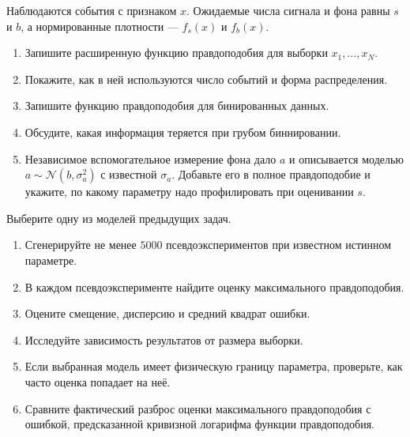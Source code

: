 \documentclass[
  russian,
  11pt,
  a4paper,
  open=any]{scrbook}
\providecommand{\tightlist}{%
  \setlength{\itemsep}{0pt}\setlength{\parskip}{0pt}}
\begin{document}
\begin{semanticpdfbox}[colback=BookCoralSoft,borderline west={1.2mm}{0pt}{BookCoral}]

\par\nopagebreak[4]\vspace{1.2mm}

Наблюдаются события с признаком \(x\). Ожидаемые числа сигнала и фона
равны \(s\) и \(b\), а нормированные плотности --- \(f_s(x)\) и
\(f_b(x)\).

\begin{enumerate}
\def\labelenumi{\arabic{enumi}.}
\tightlist
\item
  Запишите расширенную функцию правдоподобия для выборки
  \(x_1,\ldots,x_N\).
\item
  Покажите, как в ней используются число событий и форма распределения.
\item
  Запишите функцию правдоподобия для бинированных данных.
\item
  Обсудите, какая информация теряется при грубом биннировании.
\item
  Независимое вспомогательное измерение фона дало \(a\) и описывается
  моделью \(a\sim\mathcal N(b,\sigma_a^2)\) с известной \(\sigma_a\).
  Добавьте его в полное правдоподобие и укажите, по какому параметру
  надо профилировать при оценивании \(s\).
\end{enumerate}

\end{semanticpdfbox}

\begin{semanticpdfbox}[colback=BookCoralSoft,borderline west={1.2mm}{0pt}{BookCoral}]

\par\nopagebreak[4]\vspace{1.2mm}

Выберите одну из моделей предыдущих задач.

\begin{enumerate}
\def\labelenumi{\arabic{enumi}.}
\tightlist
\item
  Сгенерируйте не менее \(5000\) псевдоэкспериментов при известном
  истинном параметре.
\item
  В каждом псевдоэксперименте найдите оценку максимального
  правдоподобия.
\item
  Оцените смещение, дисперсию и средний квадрат ошибки.
\item
  Исследуйте зависимость результатов от размера выборки.
\item
  Если выбранная модель имеет физическую границу параметра, проверьте,
  как часто оценка попадает на неё.
\item
  Сравните фактический разброс оценки максимального правдоподобия с
  ошибкой, предсказанной кривизной логарифма функции правдоподобия.
\end{enumerate}

\end{semanticpdfbox}
\end{document}
